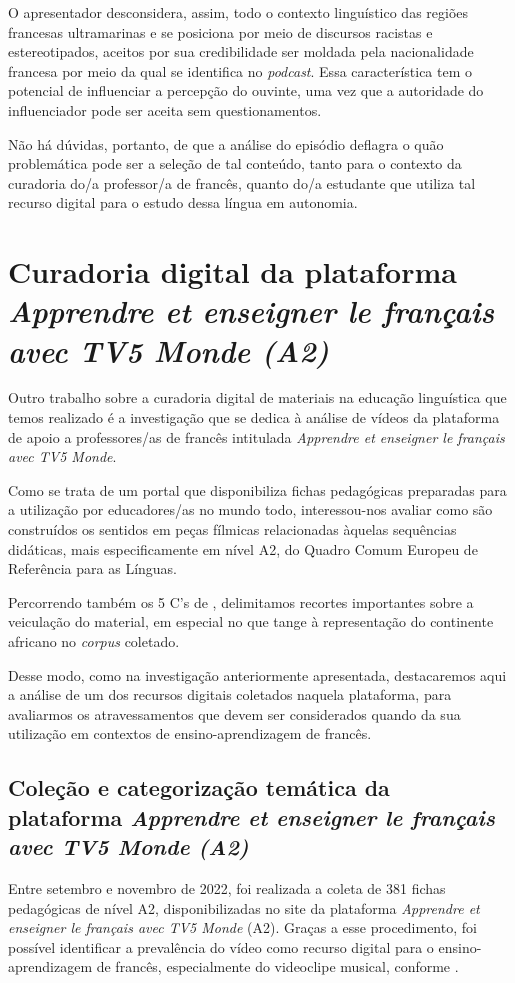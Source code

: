 \documentclass[portuguese]{textolivre}
\begin{document}
O apresentador desconsidera, assim, todo o contexto linguístico das regiões francesas ultramarinas e se posiciona por meio de discursos racistas e estereotipados, aceitos por sua credibilidade ser moldada pela nacionalidade francesa por meio da qual se identifica no \textit{podcast}. Essa característica tem o potencial de influenciar a percepção do ouvinte, uma vez que a autoridade do influenciador pode ser aceita sem questionamentos.

Não há dúvidas, portanto, de que a análise do episódio deflagra o quão problemática pode ser a seleção de tal conteúdo, tanto para o contexto da curadoria do/a professor/a de francês, quanto do/a estudante que utiliza tal recurso digital para o estudo dessa língua em autonomia. 

\section{Curadoria digital da plataforma \textit{Apprendre et enseigner le français avec TV5 Monde (A2)}}\label{sec-formato}
Outro trabalho sobre a curadoria digital de materiais na educação linguística que temos realizado é a investigação que se dedica à análise de vídeos da plataforma de apoio a professores/as de francês intitulada \textit{Apprendre et enseigner le français avec TV5 Monde}. 

Como se trata de um portal que disponibiliza fichas pedagógicas preparadas para a utilização por educadores/as no mundo todo, interessou-nos avaliar como são construídos os sentidos em peças fílmicas relacionadas àquelas sequências didáticas, mais especificamente em nível A2, do Quadro Comum Europeu de Referência para as Línguas.

Percorrendo também os 5 C’s de \textcite{deschaine_five_2015}, delimitamos recortes importantes sobre a veiculação do material, em especial no que tange à representação do continente africano no \textit{corpus} coletado. 

Desse modo, como na investigação anteriormente apresentada, destacaremos aqui a análise de um dos recursos digitais coletados naquela plataforma, para avaliarmos os atravessamentos que devem ser considerados quando da sua utilização em contextos de ensino-aprendizagem de francês.


\subsection{Coleção e categorização temática da plataforma \textit{Apprendre et enseigner le français avec TV5 Monde (A2)}}\label{sec-modelo}
Entre setembro e novembro de 2022, foi realizada a coleta de 381 fichas pedagógicas de nível A2, disponibilizadas no site da plataforma \textit{Apprendre et enseigner le français avec TV5 Monde} (A2). Graças a esse procedimento, foi possível identificar a prevalência do vídeo como recurso digital para o ensino-aprendizagem de francês, especialmente do videoclipe musical, conforme . 
\end{document}
